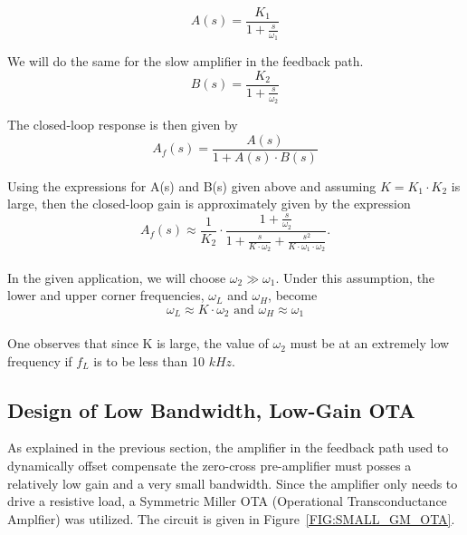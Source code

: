 \documentclass[12pt, onecolumn]{IEEEtran}
\begin{document}
\begin{equation}
A(s) = \frac{K_1}{1 + \frac{s}{\omega_1}}
\end{equation}


We will do the same for the slow amplifier in the feedback path.\\

\begin{equation}
B(s) = \frac{K_2}{1 + \frac{s}{\omega_2}}
\end{equation}


The closed-loop response is then given by \\

\begin{equation}
A_f(s) = \frac{A(s)}{1 + A(s) \cdot B(s)} 
\end{equation}


Using the expressions for A(s) and B(s) given above and assuming $K = K_1 \cdot K_2$ is large, then the closed-loop gain is approximately given by the expression \\

\begin{equation}
A_f(s) \approx \frac{1}{K_2} \cdot \frac{1 + \frac{s}{\omega_2}}{1 + \frac{s}{K \cdot \omega_2} + \frac{s^2}{K \cdot \omega_1 \cdot \omega_2}}.
\end{equation}\\


In the given application, we will choose $\omega_2 \gg \omega_1$.  Under this assumption, the lower and upper corner frequencies, $\omega_L$ and $\omega_H$, become \\

\begin{equation}
\omega_L \approx K \cdot \omega_2 \text{ and } \omega_H \approx  \omega_1
\end{equation}\\


One observes that since K is large, the value of $\omega_2$ must be at an extremely low frequency if $f_L$ is to be less than 10 $kHz$.\\


\subsection*{Design of Low Bandwidth, Low-Gain OTA}


As explained in the previous section, the amplifier in the feedback path used to dynamically offset compensate the  zero-cross pre-amplifier must posses a relatively low gain and a very small bandwidth.  Since the amplifier only needs to drive a resistive load, a Symmetric Miller OTA (Operational Transconductance Amplfier) was utilized.  The circuit is given in Figure~\ref{FIG:SMALL_GM_OTA}.
\end{document}
